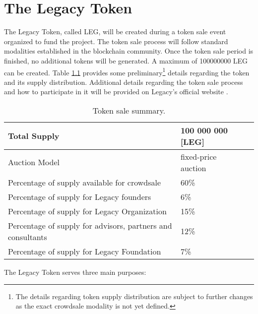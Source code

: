 \chapter{The Legacy Token} %
\label{cha:the_legacy_token}

The Legacy Token, called LEG, will be created during a token sale event organized to fund the project. The token sale process will follow standard modalities established in the blockchain community. Once the token sale period is finished, no additional tokens will be generated. A maximum of 100000000 LEG can be created. 
Table \ref{table:ico_summary} provides some preliminary\footnote{The details regarding token supply distribution are subject to further changes as the exact crowdsale modality is not yet defined.} details regarding the token and its supply distribution. Additional details regarding the token sale process and how to participate in it will be provided on Legacy's official website \cite{Legacy}.

\begin{table}[h]
	\begin{center}		
		{\renewcommand{\arraystretch}{1.3}			
			\begin{tabular}{| l | p{5cm} | p{3.5cm}  |}	
		    \hline			    
		    	Total Supply		&  100 000 000 [LEG]  \\ \hline %
		    	Auction Model       &  fixed-price auction\tablefootnote{To be confirmed.} \\ \hline														
				Percentage of supply available for crowdsale & 60\% \\ \hline
				Percentage of supply for Legacy founders     &  6\% \\ \hline
				Percentage of supply for Legacy Organization & 15\% \\ \hline
				Percentage of supply for advisors, partners and consultants & 12\% \\ \hline
				Percentage of supply for Legacy Foundation & 7\% \\	\hline	
			\end{tabular}				
		}
	\caption{Token sale summary.}
	\label{table:ico_summary}		
	\end{center}
\end{table}



The Legacy Token serves three main purposes:

